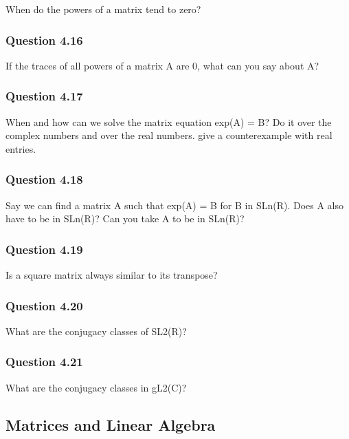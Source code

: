When do the powers of a matrix tend to zero?

\hypertarget{question-4.16}{%
\subsubsection{Question 4.16}\label{question-4.16}}

If the traces of all powers of a matrix A are 0, what can you say about
A?

\hypertarget{question-4.17}{%
\subsubsection{Question 4.17}\label{question-4.17}}

When and how can we solve the matrix equation exp(A) = B? Do it over the
complex numbers and over the real numbers. give a counterexample with
real entries.

\hypertarget{question-4.18}{%
\subsubsection{Question 4.18}\label{question-4.18}}

Say we can find a matrix A such that exp(A) = B for B in SLn(R). Does A
also have to be in SLn(R)? Can you take A to be in SLn(R)?

\hypertarget{question-4.19}{%
\subsubsection{Question 4.19}\label{question-4.19}}

Is a square matrix always similar to its transpose?

\hypertarget{question-4.20}{%
\subsubsection{Question 4.20}\label{question-4.20}}

What are the conjugacy classes of SL2(R)?

\hypertarget{question-4.21}{%
\subsubsection{Question 4.21}\label{question-4.21}}

What are the conjugacy classes in gL2(C)?

\hypertarget{matrices-and-linear-algebra}{%
\subsection{Matrices and Linear
Algebra}\label{matrices-and-linear-algebra}}

